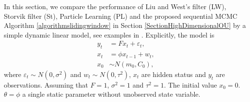 In this section, we compare the performance of Liu and West's filter (LW), Storvik filter (St), Particle Learning (PL) and the proposed sequential MCMC Algorithm \ref{algorithmslidingwindow} in Section \ref{SectionHighDimensionalOU} by a simple dynamic linear model, see examples in \citep{liu2001combined}. Explicitly, the model is 
\begin{equation}
\begin{split}
y_t&=F x_t+\varepsilon_t,\\
x_t&=\phi x_{t-1}+w_t,\\
x_0&\sim N(m_0,C_0),
\end{split}
\end{equation}
where $\varepsilon_t\sim N\left(0,\sigma^2\right)$ and $w_t\sim N\left(0,\tau^2\right)$, $x_t$ are hidden status and $y_t$ are observations. Assuming that $F=1$, $\sigma^2=1$ and $\tau^2=1$. The initial value $x_0=0$. $\theta = \phi$ a single static parameter without unobserved state variable. 


